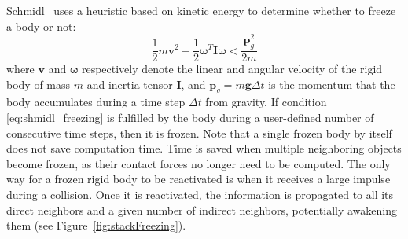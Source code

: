 Schmidl~\cite{Schmidl2002} uses a heuristic based on kinetic energy to determine whether to freeze a body or not:
\begin{equation}
\label{eq:shmidl_freezing}
\frac{1}{2}m\mathbf{v}^{2} + \frac{1}{2}\mathbf{\omega}^{T}\mathbf{I}\mathbf{\omega} < \frac{\mathbf{p}_{g}^{2}}{2m}
\end{equation}
where $\mathbf{v}$ and $\mathbf{\omega}$ respectively denote the linear and angular velocity of the rigid body of mass $m$ and inertia tensor $\mathbf{I}$, and $\mathbf{p}_{g}=m\mathbf{g}\Delta t$ is the momentum that the body accumulates during a time step $\Delta t$ from gravity.
If condition \eqref{eq:shmidl_freezing} is fulfilled by the body during a user-defined number of consecutive time steps, then it is frozen.
Note that a single frozen body by itself does not save computation time.
Time is saved when multiple neighboring objects become frozen, as their contact forces no longer need to be computed.
The only way for a frozen rigid body to be reactivated is when it receives a large impulse during a collision.
Once it is reactivated, the information is propagated to all its direct neighbors and a given number of indirect neighbors, potentially awakening them (see Figure~\ref{fig:stackFreezing}).
